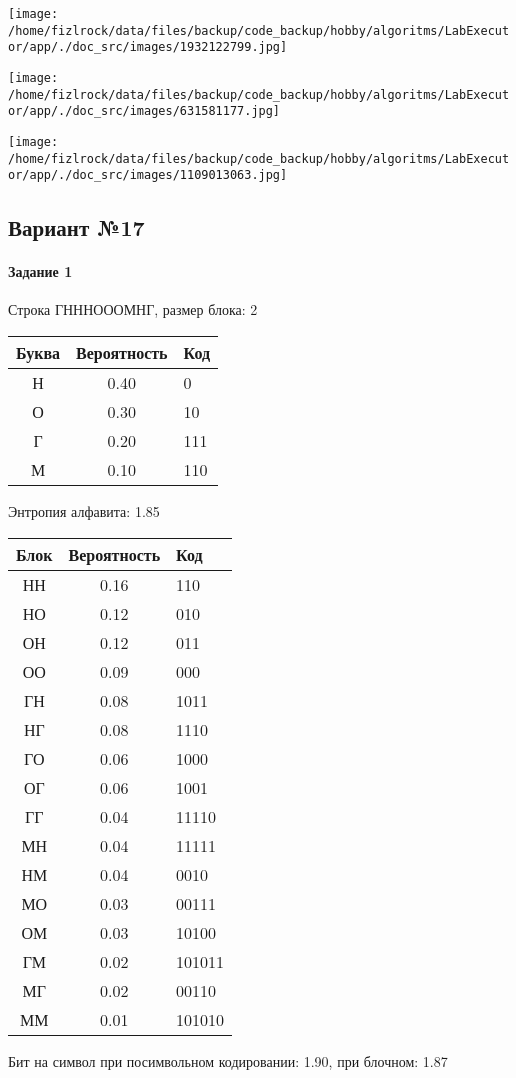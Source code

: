 \documentclass[a4paper, 12pt]{article}
\begin{document}
\texttt{[image: /home/fizlrock/data/files/backup/code\_backup/hobby/algoritms/LabExecutor/app/./doc\_src/images/1932122799.jpg]}

\texttt{[image: /home/fizlrock/data/files/backup/code\_backup/hobby/algoritms/LabExecutor/app/./doc\_src/images/631581177.jpg]}

\texttt{[image: /home/fizlrock/data/files/backup/code\_backup/hobby/algoritms/LabExecutor/app/./doc\_src/images/1109013063.jpg]}
\pagebreak
\subsection{Вариант №17}
\paragraph{Задание 1}

Строка ГНННОООМНГ, размер блока: 2
\begin{center}
 \begin{tabular}{ |c|c|l| } 
  \hline
     Буква & Вероятность & Код\\ \hline
Н & 0.40 & 0\\\hline
О & 0.30 & 10\\\hline
Г & 0.20 & 111\\\hline
М & 0.10 & 110
\\ \hline \end{tabular}
\end{center}
Энтропия алфавита: 1.85
\begin{center}
 \begin{tabular}{ |c|c|l| } 
  \hline
     Блок & Вероятность & Код\\ \hline
НН & 0.16 & 110\\\hline
НО & 0.12 & 010\\\hline
ОН & 0.12 & 011\\\hline
ОО & 0.09 & 000\\\hline
ГН & 0.08 & 1011\\\hline
НГ & 0.08 & 1110\\\hline
ГО & 0.06 & 1000\\\hline
ОГ & 0.06 & 1001\\\hline
ГГ & 0.04 & 11110\\\hline
МН & 0.04 & 11111\\\hline
НМ & 0.04 & 0010\\\hline
МО & 0.03 & 00111\\\hline
ОМ & 0.03 & 10100\\\hline
ГМ & 0.02 & 101011\\\hline
МГ & 0.02 & 00110\\\hline
ММ & 0.01 & 101010
\\ \hline \end{tabular}
\end{center}
Бит на символ при посимвольном кодировании: 1.90, при блочном: 1.87
\end{document}
